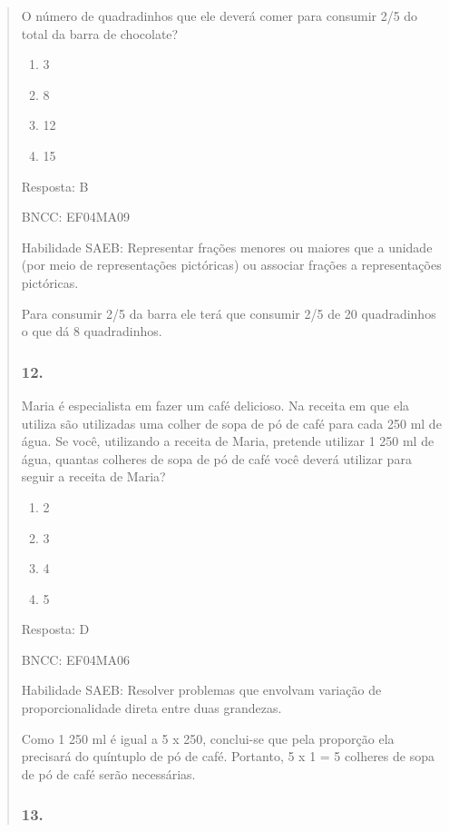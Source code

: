 \begin{enumerate}
\begin{escolha}
\begin{enumerate}
\begin{itemize}
\begin{itemize}
\begin{escolha}
\begin{quote}
\begin{escolha}
{O número de quadradinhos que ele deverá comer para consumir 2/5 do total
da barra de chocolate?

\begin{enumerate}
\def\labelenumi{\alph{enumi})}
\item
  3
\item
  8
\item
  12
\item
  15
\end{enumerate}

Resposta: B

BNCC: EF04MA09

Habilidade SAEB: Representar frações menores ou maiores que a unidade
(por meio de representações pictóricas) ou associar frações a
representações pictóricas.

Para consumir 2/5 da barra ele terá que consumir 2/5 de 20 quadradinhos
o que dá 8 quadradinhos.

\subsubsection{12.}\label{section-168}

Maria é especialista em fazer um café delicioso. Na receita em que ela
utiliza são utilizadas uma colher de sopa de pó de café para cada 250 ml
de água. Se você, utilizando a receita de Maria, pretende utilizar 1 250
ml de água, quantas colheres de sopa de pó de café você deverá utilizar
para seguir a receita de Maria?

\begin{enumerate}
\def\labelenumi{\alph{enumi})}
\item
  2
\item
  3
\item
  4
\item
  5
\end{enumerate}

Resposta: D

BNCC: EF04MA06

Habilidade SAEB: Resolver problemas que envolvam variação de
proporcionalidade direta entre duas grandezas.

Como 1 250 ml é igual a 5 x 250, conclui-se que pela proporção ela
precisará do quíntuplo de pó de café. Portanto, 5 x 1 = 5 colheres de
sopa de pó de café serão necessárias.

\subsubsection{13.}\label{section-169}

}
\end{escolha}
\end{quote}
\end{escolha}
\end{itemize}
\end{itemize}
\end{enumerate}
\end{escolha}
\end{enumerate}
